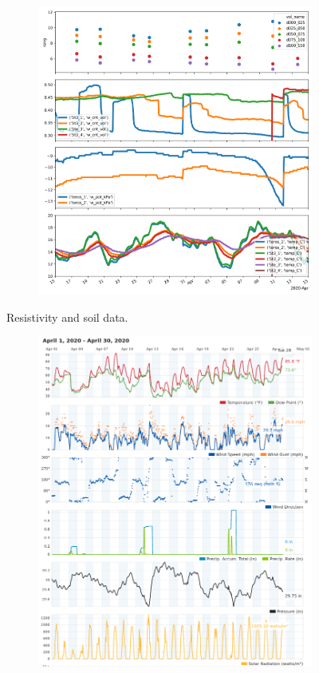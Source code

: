 \documentclass[a4paper,12pt]{article}
\begin{document}
\begin{figure}[H]
\centering
\begin{subfigure}{\textwidth}
\includegraphics[width=\textwidth]{summary.png}
\end{subfigure}
\caption{Resistivity and soil data.}
\end{figure}

\begin{figure}[H]
\centering
\begin{subfigure}{\textwidth}
\includegraphics[width=\textwidth]{weatherApril.png}
\end{subfigure}
\end{figure}
\end{document}
